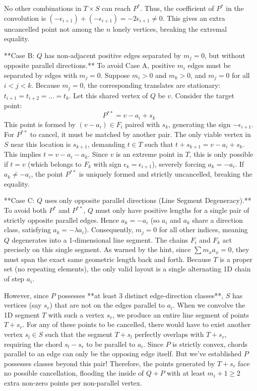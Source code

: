 No other combinations in $T \times S$ can reach $P^*$. Thus, the coefficient of $P^*$ in the convolution is $(-\epsilon_{i+1}) + (-\epsilon_{i+1}) = -2\epsilon_{i+1} \neq 0$. This gives an extra uncancelled point not among the $n$ lonely vertices, breaking the extremal equality.

**Case B: $Q$ has non-adjacent positive edges separated by $m_j=0$, but without opposite parallel directions.**
To avoid Case A, positive $m_i$ edges must be separated by edges with $m_j = 0$. Suppose $m_i > 0$ and $m_k > 0$, and $m_j = 0$ for all $i < j < k$. 
Because $m_j = 0$, the corresponding translates are stationary: $t_{i+1} = t_{i+2} = \dots = t_k$. Let this shared vertex of $Q$ be $v$.
Consider the target point:
$$ P^{**} = v - a_i + s_k $$
This point is formed by $(v - a_i) \in F_i$ paired with $s_k$, generating the sign $-\epsilon_{i+1}$.
For $P^{**}$ to cancel, it must be matched by another pair. The only viable vertex in $S$ near this location is $s_{k+1}$, demanding $t \in T$ such that $t + s_{k+1} = v - a_i + s_k$. This implies $t = v - a_i - a_k$. Since $v$ is an extreme point in $T$, this is only possible if $t = v$ (which belongs to $F_k$ with sign $\epsilon_k = \epsilon_{i+1}$), severely forcing $a_k = -a_i$.
If $a_k \neq -a_i$, the point $P^{**}$ is uniquely formed and strictly uncancelled, breaking the equality.

**Case C: $Q$ uses only opposite parallel directions (Line Segment Degeneracy).**
To avoid both $P^*$ and $P^{**}$, $Q$ must only have positive lengths for a single pair of strictly opposite parallel edges. Hence $a_k = -a_i$ (so $a_i$ and $a_k$ share a direction class, satisfying $a_k = -\lambda a_i$).
Consequently, $m_j = 0$ for all other indices, meaning $Q$ degenerates into a 1-dimensional line segment. 
The chains $F_i$ and $F_k$ act precisely on this single segment. As warned by the hint, since $\sum m_x a_x = 0$, they must span the exact same geometric length back and forth. Because $T$ is a proper set (no repeating elements), the only valid layout is a single alternating 1D chain of step $a_i$.

However, since $P$ possesses **at least 3 distinct edge-direction classes**, $S$ has vertices (say $s_r$) that are not on the edges parallel to $a_i$.
When we convolve the 1D segment $T$ with such a vertex $s_r$, we produce an entire line segment of points $T + s_r$. 
For any of these points to be cancelled, there would have to exist another vertex $s_l \in S$ such that the segment $T + s_l$ perfectly overlaps with $T + s_r$, requiring the chord $s_l - s_r$ to be parallel to $a_i$. Since $P$ is strictly convex, chords parallel to an edge can only be the opposing edge itself. But we've established $P$ possesses classes beyond this pair!
Therefore, the points generated by $T + s_r$ face no possible cancellation, flooding the inside of $Q+P$ with at least $m_i + 1 \ge 2$ extra non-zero points per non-parallel vertex.


